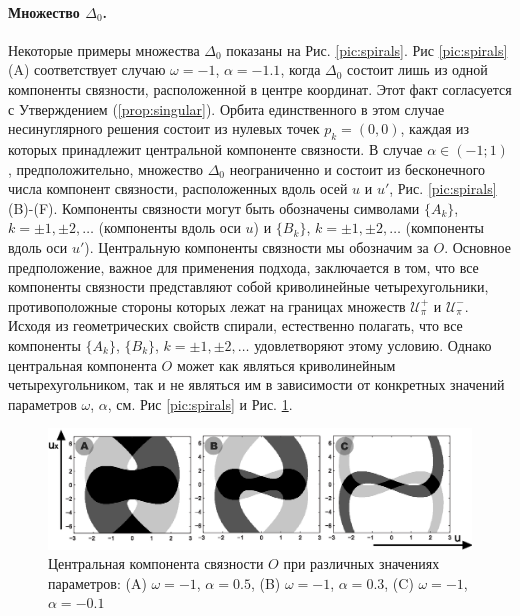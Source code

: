 \paragraph{Множество $\Delta_0$.}
Некоторые примеры множества $\Delta_0$ показаны на Рис. \ref{pic:spirals}.
Рис \ref{pic:spirals} (A) соответствует случаю $\omega = -1$, $\alpha = -1.1$, когда $\Delta_0$ состоит лишь из одной компоненты связности, расположенной в центре координат.
Этот факт согласуется с Утверждением (\ref{prop:singular}).
Орбита единственного в этом случае несинуглярного решения состоит из нулевых точек $p_k = (0, 0)$, каждая из которых принадлежит центральной компоненте связности.
В случае $\alpha \in (-1; 1)$, предположительно, множество $\Delta_0$ неограниченно и состоит из бесконечного числа компонент связности, расположенных вдоль осей $u$ и $u'$, Рис. \ref{pic:spirals} (B)-(F).
Компоненты связности могут быть обозначены символами $\{ A_k \}$, $k = \pm 1, \pm 2, \dots$ (компоненты вдоль оси $u$) и $\{ B_k \}$, $k = \pm 1, \pm 2, \dots$ (компоненты вдоль оси $u'$).
Центральную компоненты связности мы обозначим за $O$.
Основное предположение, важное для применения подхода, заключается в том, что все компоненты связности представляют собой криволинейные четырехугольники, противоположные стороны которых лежат на границах множеств $\mathcal{U}_{\pi}^+$ и $\mathcal{U}_{\pi}^-$.
Исходя из геометрических свойств спирали, естественно полагать, что все компоненты $\{ A_k \}$, $\{ B_k \}$, $k = \pm 1, \pm 2, \dots$ удовлетворяют этому условию.
Однако центральная компонента $O$ может как являться криволинейным четырехугольником, так и не являться им в зависимости от конкретных значений параметров $\omega$, $\alpha$, см. Рис \ref{pic:spirals} и Рис. \ref{pic:central}.
%
\begin{figure}
\includegraphics[width=\linewidth]{pic/central.eps}
\caption{Центральная компонента связности $O$ при различных значениях параметров: (A) $\omega = -1$, $\alpha = 0.5$, (B) $\omega = -1$, $\alpha = 0.3$, (C) $\omega = -1$, $\alpha = -0.1$}
\label{pic:central}
\end{figure}
%

